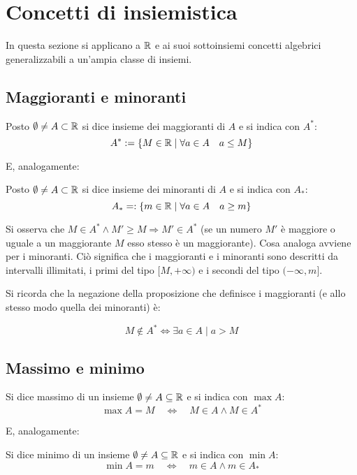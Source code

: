 %
%
%
%


\section{Concetti di insiemistica}
In questa sezione si applicano a $\mathbb{R}$ e ai suoi sottoinsiemi concetti algebrici generalizzabili a un'ampia classe di insiemi.

\subsection{Maggioranti e minoranti}
\begin{defin}
	Posto $\emptyset\neq A\subset\mathbb{R}$ si dice insieme dei maggioranti di $A$ e si indica con $A^*$:
	\[
		A^*:=\{M\in\mathbb{R}\mid\forall a\in A\quad a\leq M\}
	\]
\end{defin}
E, analogamente:
\begin{defin}
	Posto $\emptyset\neq A\subset\mathbb{R}$ si dice insieme dei minoranti di $A$ e si indica con $A_*$:
	\[
		A_*=:\{m\in\mathbb{R}\mid\forall a\in A\quad a\geq m\}
	\]
\end{defin}
Si osserva che $M\in A^*\land M'\geq M\Rightarrow M'\in A^*$ (se un numero $M'$ è maggiore o uguale a un maggiorante $M$ esso stesso è un maggiorante). Cosa analoga avviene per i minoranti. Ciò significa che i maggioranti e i minoranti sono descritti da intervalli illimitati, i primi del tipo $[M,+\infty)$ e i secondi del tipo $(-\infty,m]$.

Si ricorda che la negazione della proposizione che definisce i maggioranti (e allo stesso modo quella dei minoranti) è:
\begin{propo}
	\[
		M\notin A^*\iff\exists a\in A\mid a>M
	\]
\end{propo}


\subsection{Massimo e minimo}
\begin{defin}
	Si dice massimo di un insieme $\emptyset\neq A\subseteq\mathbb{R}$ e si indica con $\max A$:
	\[
		\max A=M\quad\Leftrightarrow\quad M\in A\land M\in A^*
	\]
\end{defin}
E, analogamente:
\begin{defin}
	Si dice minimo di un insieme $\emptyset\neq A\subseteq\mathbb{R}$ e si indica con $\min A$:
	\[
		\min A=m\quad\Leftrightarrow\quad m\in A\land m\in A_*
	\]
\end{defin}


